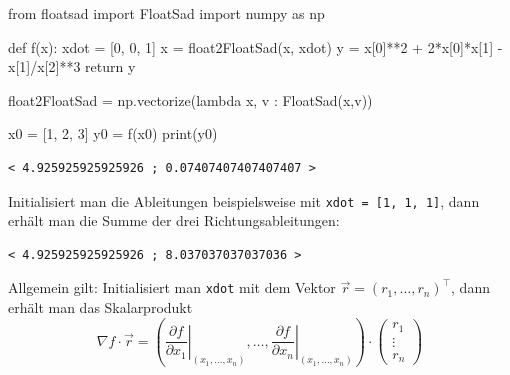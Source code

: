 \documentclass[
  a4paper,
  DIV=11]{scrreprt}
\newenvironment{Shaded}{\begin{snugshade}}{\end{snugshade}}
\newcommand{\BuiltInTok}[1]{\textcolor[rgb]{0.00,0.23,0.31}{#1}}
\newcommand{\ControlFlowTok}[1]{\textcolor[rgb]{0.00,0.23,0.31}{#1}}
\newcommand{\DecValTok}[1]{\textcolor[rgb]{0.68,0.00,0.00}{#1}}
\newcommand{\ImportTok}[1]{\textcolor[rgb]{0.00,0.46,0.62}{#1}}
\newcommand{\KeywordTok}[1]{\textcolor[rgb]{0.00,0.23,0.31}{#1}}
\newcommand{\NormalTok}[1]{\textcolor[rgb]{0.00,0.23,0.31}{#1}}
\newcommand{\OperatorTok}[1]{\textcolor[rgb]{0.37,0.37,0.37}{#1}}
\theoremstyle{definition}
\theoremstyle{definition}
\theoremstyle{remark}
\begin{document}
\begin{Shaded}
\begin{Highlighting}[]
\ImportTok{from}\NormalTok{ floatsad }\ImportTok{import}\NormalTok{ FloatSad}
\ImportTok{import}\NormalTok{ numpy }\ImportTok{as}\NormalTok{ np}

\KeywordTok{def}\NormalTok{ f(x):}
\NormalTok{    xdot }\OperatorTok{=}\NormalTok{ [}\DecValTok{0}\NormalTok{, }\DecValTok{0}\NormalTok{, }\DecValTok{1}\NormalTok{]}
\NormalTok{    x }\OperatorTok{=}\NormalTok{ float2FloatSad(x, xdot)}
\NormalTok{    y }\OperatorTok{=}\NormalTok{ x[}\DecValTok{0}\NormalTok{]}\OperatorTok{**}\DecValTok{2} \OperatorTok{+} \DecValTok{2}\OperatorTok{*}\NormalTok{x[}\DecValTok{0}\NormalTok{]}\OperatorTok{*}\NormalTok{x[}\DecValTok{1}\NormalTok{] }\OperatorTok{{-}}\NormalTok{ x[}\DecValTok{1}\NormalTok{]}\OperatorTok{/}\NormalTok{x[}\DecValTok{2}\NormalTok{]}\OperatorTok{**}\DecValTok{3}
    \ControlFlowTok{return}\NormalTok{ y}

\NormalTok{float2FloatSad }\OperatorTok{=}\NormalTok{ np.vectorize(}\KeywordTok{lambda}\NormalTok{ x, v : FloatSad(x,v))}

\NormalTok{x0 }\OperatorTok{=}\NormalTok{ [}\DecValTok{1}\NormalTok{, }\DecValTok{2}\NormalTok{, }\DecValTok{3}\NormalTok{]}
\NormalTok{y0 }\OperatorTok{=}\NormalTok{ f(x0)}
\BuiltInTok{print}\NormalTok{(y0)}
\end{Highlighting}
\end{Shaded}

\begin{verbatim}
< 4.925925925925926 ; 0.07407407407407407 >
\end{verbatim}

Initialisiert man die Ableitungen beispielsweise mit
\texttt{xdot\ =\ {[}1,\ 1,\ 1{]}}, dann erhält man die Summe der drei
Richtungsableitungen:

\begin{verbatim}
< 4.925925925925926 ; 8.037037037037036 >
\end{verbatim}

Allgemein gilt: Initialisiert man \texttt{xdot} mit dem Vektor
\(\vec r = (r_1, \ldots, r_n)^\intercal\), dann erhält man das
Skalarprodukt \[
\nabla f \cdot \vec r = 
\left ( \left .\frac{\partial f}{\partial x_1} \right \vert_{(x_1, \ldots, x_n)}, \ldots, \left .\frac{\partial f}{\partial x_n} \right \vert_{(x_1, \ldots, x_n)}  \right ) \cdot \begin{pmatrix} r_1 \\ \vdots \\ r_n \end{pmatrix} 
\]
\end{document}
